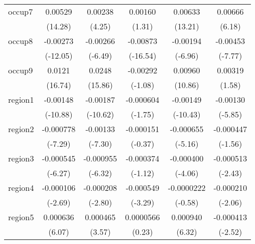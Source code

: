 \begin{table}[htbp]
\begin{tabular}{l*{5}{c}}
occup7      &     0.00529\sym{***}&     0.00238\sym{***}&     0.00160         &     0.00633\sym{***}&     0.00666\sym{***}\\
            &     (14.28)         &      (4.25)         &      (1.31)         &     (13.21)         &      (6.18)         \\
occup8      &    -0.00273\sym{***}&    -0.00266\sym{***}&    -0.00873\sym{***}&    -0.00194\sym{***}&    -0.00453\sym{***}\\
            &    (-12.05)         &     (-6.49)         &    (-16.54)         &     (-6.96)         &     (-7.77)         \\
occup9      &      0.0121\sym{***}&      0.0248\sym{***}&    -0.00292         &     0.00960\sym{***}&     0.00319         \\
            &     (16.74)         &     (15.86)         &     (-1.08)         &     (10.86)         &      (1.58)         \\
region1     &    -0.00148\sym{***}&    -0.00187\sym{***}&   -0.000604         &    -0.00149\sym{***}&    -0.00130\sym{***}\\
            &    (-10.88)         &    (-10.62)         &     (-1.75)         &    (-10.43)         &     (-5.85)         \\
region2     &   -0.000778\sym{***}&    -0.00133\sym{***}&   -0.000151         &   -0.000655\sym{***}&   -0.000447         \\
            &     (-7.29)         &     (-7.30)         &     (-0.37)         &     (-5.16)         &     (-1.56)         \\
region3     &   -0.000545\sym{***}&   -0.000955\sym{***}&   -0.000374         &   -0.000400\sym{***}&   -0.000513\sym{*}  \\
            &     (-6.27)         &     (-6.32)         &     (-1.12)         &     (-4.06)         &     (-2.43)         \\
region4     &   -0.000106\sym{**} &   -0.000208\sym{**} &   -0.000549\sym{***}&  -0.0000222         &   -0.000210\sym{*}  \\
            &     (-2.69)         &     (-2.80)         &     (-3.29)         &     (-0.58)         &     (-2.06)         \\
region5     &    0.000636\sym{***}&    0.000465\sym{***}&   0.0000566         &    0.000940\sym{***}&   -0.000413\sym{*}  \\
            &      (6.07)         &      (3.57)         &      (0.23)         &      (6.32)         &     (-2.52)         \\

\end{tabular}
\end{table}
